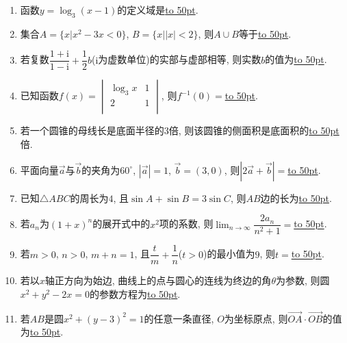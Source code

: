 \documentclass[10pt,a4paper]{article}
\newcommand{\blank}[1]{\underline{\hbox to #1pt{}}}
\begin{document}
\begin{enumerate}[1.]

\item 函数$y=\log_3 (x-1)$的定义域是\blank{50}.
\item 集合$A=\{x|x^2-3x<0\}$, $B=\{x||x|<2\}$, 则$A\cup B$等于\blank{50}.
\item 若复数$\dfrac{1+\mathrm{i}}{1-\mathrm{i}}+\dfrac12b$($\mathrm{i}$为虚数单位)的实部与虚部相等, 则实数$b$的值为\blank{50}.
\item 已知函数$f(x)=\begin{vmatrix}   {\log _3}x & 1  \\   2 & 1  \\\end{vmatrix}$, 则$f^{-1}(0)=$\blank{50}.
\item 若一个圆锥的母线长是底面半径的$3$倍, 则该圆锥的侧面积是底面积的\blank{50}倍.
\item 平面向量$\overrightarrow a$与$\overrightarrow b$的夹角为$60^\circ$, $|\overrightarrow a|=1$, $\overrightarrow b=(3,0)$, 则$|2 \overrightarrow a+\overrightarrow b|=$\blank{50}.
\item 已知$\triangle ABC$的周长为$4$, 且$\sin A+\sin B=3 \sin C$, 则$AB$边的长为\blank{50}.
\item 若$a_n$为$(1+x)^n$的展开式中的$x^2$项的系数, 则$\displaystyle\lim_{n\to\infty}\dfrac{2a_n}{n^2+1}=$\blank{50}.
\item 若$m>0$, $n>0$, $m+n=1$, 且$\dfrac t m+\dfrac 1 n$($t>0$)的最小值为$9$, 则$t=$\blank{50}.
\item 若以$x$轴正方向为始边, 曲线上的点与圆心的连线为终边的角$\theta$为参数, 则圆$x^2+y^2-2x=0$的参数方程为\blank{50}.
\item 若$AB$是圆$x^2+(y-3)^2=1$的任意一条直径, $O$为坐标原点, 则$\overrightarrow{OA}\cdot \overrightarrow{OB}$的值为\blank{50}.



\end{enumerate}
\end{document}
